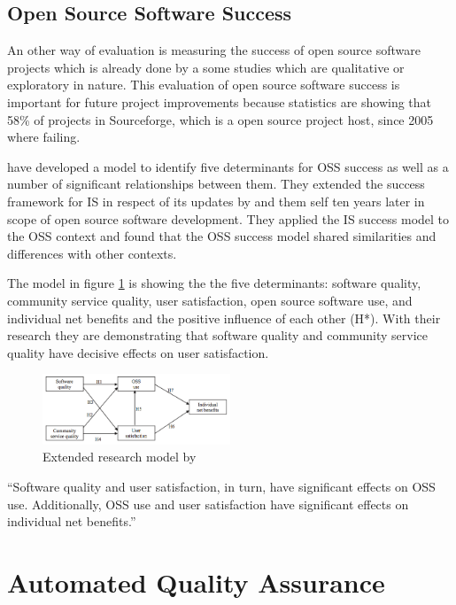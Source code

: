 \documentclass[DIV=calc,paper=a4,fontsize=9pt,twocolumn]{scrartcl}
\begin{document}
\subsection{Open Source Software Success}

An other way of evaluation is measuring the success of open source software projects which is already done by a some studies which are qualitative or exploratory in nature. This evaluation of open source software success is important for future project improvements because statistics are showing that 58\% of projects in Sourceforge, which is a open source project host, since 2005 where failing. 

\citet{lee2009measuring} have developed a model to identify five determinants for OSS success as well as a number of significant relationships between them. They extended the \citet{delone1992information} success framework for IS in respect of its updates by \citet{seddon1997respecification} and them self ten years later in scope of open source software development. They applied the IS success model to the OSS context and found that the OSS success model shared similarities and differences with other contexts. 

The model in figure \ref{fig:success-model} is showing the the five determinants: software quality, community service quality, user satisfaction, open source software use, and individual net benefits and the positive influence of each other (H*). With their research they are demonstrating that software quality and community service quality have decisive effects on user satisfaction. \citep{lee2009measuring}

\begin{figure}[ht]
    \includegraphics[width=0.5\textwidth ]{img/success-model.png}{}
    \centering
    \caption{Extended research model by \citet{lee2009measuring}}\label{fig:success-model}
\end{figure}

\enquote{Software quality and user satisfaction, in turn, have significant effects on OSS use. Additionally, OSS use and user satisfaction have significant effects on individual net benefits.} \citep{lee2009measuring}

\section{Automated Quality Assurance}\label{sec:automated-quality-assurance}
\end{document}
